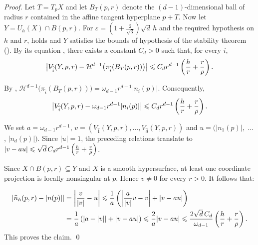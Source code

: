\begin{proof}
  Let $T=T_pX$ and let $B_T(p,r)$ denote the $(d-1)$-dimensional ball
  of radius $r$ contained in the affine tangent hyperplane $p+T$. Now
  let $Y=U_h(X) \cap B(p,r)$. For
  $\varepsilon=\left(1+\frac{2}{\sqrt3}\right)\sqrt d\,h$ and the
  required hypothesis on $h$ and $r$,
   holds and $Y$ satisfies the
  bounds of hypothesis  of the stability theorem
  ().  By its equation
  , there exists a constant $C_d>0$ such that,
  for every $i$,
\[
\left|
V_{\widehat{i}}(Y,p,r)
- \mathcal H^{d-1}
\bigl(\pi_{\widehat i}(B_T(p,r))\bigr)
\right|
\leqslant
C_d r^{d-1}\left(\frac{h}{r}+\frac{r}{\rho}\right).
\]


By , 
\(
\mathcal H^{d-1}
\bigl(\pi_{\widehat i}(B_T(p,r))\bigr)
=
\omega_{d-1}r^{d-1}|n_i(p)|.
\)
Consequently,
\[
\left|V_{\widehat{i}}(Y,p,r)-\omega_{d-1}r^{d-1}|n_i(p)|\right|
\leqslant C_d r^{d-1}\left(\frac{h}{r}+\frac{r}{\rho}\right).
\]

We set $a=\omega_{d-1}r^{d-1}$,
$v=(V_{\widehat{1}}(Y,p,r),\ldots,V_{\widehat{d}}(Y,p,r))$ and
$u=(|n_1(p)|,$ $\ldots$, $|n_d(p)|)$.  Since $|u|=1$, the preceding relations translate to
$|v-au| \leqslant \sqrt d\,C_d r^{d-1}\left(\frac{h}{r}+\frac{r}{\rho}\right)$.

Since $X\cap B(p,r)\subseteq Y$ and $X$ is a smooth hypersurface, at
least one coordinate projection is locally nonsingular at $p$. Hence
$v\ne 0$ for every $r>0$.
It follows that:

\begin{align*}
\left|\widehat n_h(p,r)-|n(p)|\right|
&= \left|
\frac{v}{|v|}-u
\right|
\leqslant \frac{1}{a}\left(\left| \frac{a}{|v|}v - v \right| + |v-au| \right) \\
&= \frac{1}{a}\left(|a-|v|| + |v-au| \right) \leqslant \frac{2}{a}|v-au|
\leqslant \frac{2\sqrt d\,C_d}
    {\omega_{d-1}}
    \left(\frac{h}{r}+\frac{r}{\rho}\right).
\end{align*}
This proves the claim. 
\qed
\end{proof}


